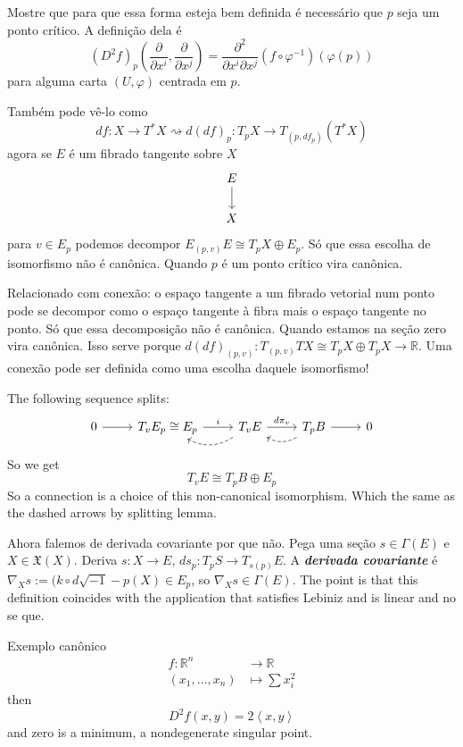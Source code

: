 \begin{exercise}\leavevmode
Mostre que para que essa forma esteja bem definida é necessário que \(p\) seja um ponto crítico. A definição dela é
\[(D^2f)_p\left(\frac{\partial }{\partial x^i}, \frac{\partial }{\partial x^j}\right) =\frac{\partial ^2}{\partial x^i \partial x^j}(f \circ \varphi^{-1})(\varphi(p))\]
para alguma carta \((U,\varphi)\) centrada em \(p\).

Também pode vê-lo como
\[df:X \to T^*X \rightsquigarrow d(df)_p:T_pX \to T_{(p,df_p)}(T^*X)\]
agora se \(E\) é um fibrado tangente sobre \(X\)
\[\begin{tikzcd}
E\arrow[d]\\
X
\end{tikzcd}\]
para \(v \in E_p\) podemos decompor \(E_{(p,v)}E  \cong T_pX \oplus  E_p\). Só que essa escolha de isomorfismo não é canônica. Quando \(p\) é um ponto crítico vira canônica.

Relacionado com conexão: o espaço tangente a um fibrado vetorial num ponto pode se decompor como o espaço tangente à fibra mais o espaço tangente no ponto. Só que essa decomposição não é canônica. Quando estamos na seção zero vira canônica. Isso serve porque \(d(df)_{(p,v)}:T_{(p,v)}TX \cong T_pX \oplus  T_pX\to \mathbb{R}\). Uma conexão pode ser definida como uma escolha daquele isomorfismo!

The following sequence splits:
\[\begin{tikzcd}0\arrow[r]&T_vE_p \cong E_p\arrow[r,"i"]&\arrow[l,dashed,bend left]T_vE\arrow[r,"d\pi_v"]&T_pB\arrow[l,dashed, bend left]\arrow[r]&0\end{tikzcd}\]
So we get
\[T_vE \cong T_pB \oplus  E_p\]
So a connection is a choice of this non-canonical isomorphism. Which the same as the dashed arrows by splitting lemma.

Ahora falemos de derivada covariante por que não. Pega uma seção \(s \in \Gamma(E)\) e \( X \in \mathfrak{X}(X)\). Deriva \(s: X \to E\), \(ds_p:T_pS \to T_{s(p)}E\). A \textit{\textbf{derivada covariante }} é \(\nabla_X s:=(k \circ d\sqrt{-1}-p(X)\in E_p\), so \(\nabla_Xs \in \Gamma(E)\). The point is that this definition coincides with the application that satisfies Lebiniz and is linear and no se que.
\end{exercise}

\begin{thing6}{Exemplo canônico}\leavevmode
\begin{align*}
	f: \mathbb{R}^n &\longrightarrow \mathbb{R} \\
	(x_1,\ldots,x_n) &\longmapsto \sum x_i^2
\end{align*}
then
 \[D^2f(x,y)=2 \left<x,y\right>\]
 and zero is a minimum, a nondegenerate singular point.
\end{thing6}

